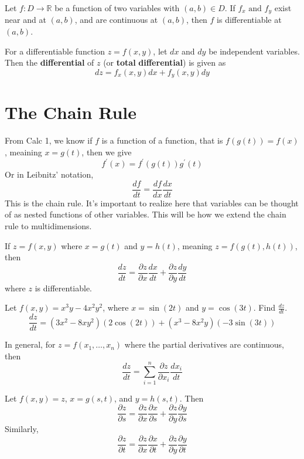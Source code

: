 \begin{theorem}
    Let \(f:D\to \mathbb{R} \) be a function of two variables with \((a,b)\in D\). If \(f_x\text{ and }  f_y\) exist near and at \((a,b)\), and are continuous at \((a,b)\), then \(f\) is differentiable at \((a,b)\).
\end{theorem}
\begin{definition}[Differentials]
    For a differentiable function \(z=f(x,y)\), let \(dx\) and \(dy\) be independent variables. Then the \textbf{differential} of \(z\) (or \textbf{total} \textbf{differential}) is given as 
    \[
        dz=f_x (x,y)dx +f_y (x,y)dy
    \]
\end{definition}
\section{The Chain Rule}
From Calc 1, we know if \(f\) is a function of a function, that is \(f(g(t))=f(x)\), meaining \(x=g(t)\), then we give 
\[
    f^{\prime} (x)=f^{\prime} (g(t))g^{\prime} (t)
\]
Or in Leibnitz' notation, 
\[
    \frac{df}{dt}=\frac{df}{dx}\frac{dx}{dt}
\]
This is the chain rule. It's important to realize here that variables can be thought of as nested functions of other variables. This will be how we extend the chain rule to multidimensions. 
\begin{theorem}
    If \(z=f(x,y)\) where \(x=g(t)\) and \(y=h(t)\), meaning \(z=f(g(t),h(t))\), then 
    \[
        \frac{dz}{dt}=\frac{\partial z}{\partial x}\frac{d x}{d t}+\frac{\partial z}{\partial y}\frac{d y}{d t}
    \]
    where \(z\) is differentiable.
\end{theorem}
\begin{eg}
    Let \(f(x,y)=x^3 y-4x^2 y^2\), where \(x=\sin (2t)\) and \(y=\cos (3t)\). Find \(\frac{dz}{dt}\). 
    \[
        \frac{dz}{dt}=(3x^2 -8xy^2)(2\cos (2t))+(x^3 -8x^2 y)(-3\sin (3t))
    \]
\end{eg}
\begin{corollary}
    In general, for \(z=f(x_1,\ldots,x_n)\) where the partial derivatives are continuous, then 
    \[
        \frac{dz}{dt}=\sum_{i=1}^n \frac{\partial z}{\partial x_{i} }\frac{dx_i}{dt} 
    \]
\end{corollary}
\begin{theorem}
    Let \(f(x,y)=z\), \(x=g(s,t)\), and \(y=h(s,t)\). Then 
    \[
        \frac{\partial z}{\partial s}=\frac{\partial z}{\partial x}\frac{\partial x}{\partial s}+\frac{\partial z}{\partial y}\frac{\partial y}{\partial s}
    \]
    Similarly,
    \[
        \frac{\partial z}{\partial t}=\frac{\partial z}{\partial x}\frac{\partial x}{\partial t}+\frac{\partial z}{\partial y}\frac{\partial y}{\partial t}
    \]
\end{theorem}
